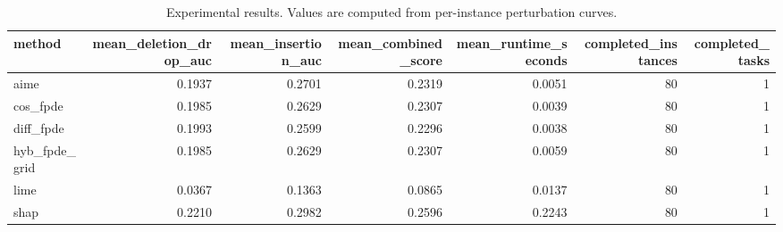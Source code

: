 \begin{table}[t]
\caption{Experimental results. Values are computed from per-instance perturbation curves.}
\label{tab:main_results_computed}
\centering
\begin{tabular}{lrrrrrr}
\toprule
method & mean\_deletion\_drop\_auc & mean\_insertion\_auc & mean\_combined\_score & mean\_runtime\_seconds & completed\_instances & completed\_tasks \\
\midrule
aime & 0.1937 & 0.2701 & 0.2319 & 0.0051 & 80 & 1 \\
cos\_fpde & 0.1985 & 0.2629 & 0.2307 & 0.0039 & 80 & 1 \\
diff\_fpde & 0.1993 & 0.2599 & 0.2296 & 0.0038 & 80 & 1 \\
hyb\_fpde\_grid & 0.1985 & 0.2629 & 0.2307 & 0.0059 & 80 & 1 \\
lime & 0.0367 & 0.1363 & 0.0865 & 0.0137 & 80 & 1 \\
shap & 0.2210 & 0.2982 & 0.2596 & 0.2243 & 80 & 1 \\
\bottomrule
\end{tabular}

\end{table}

